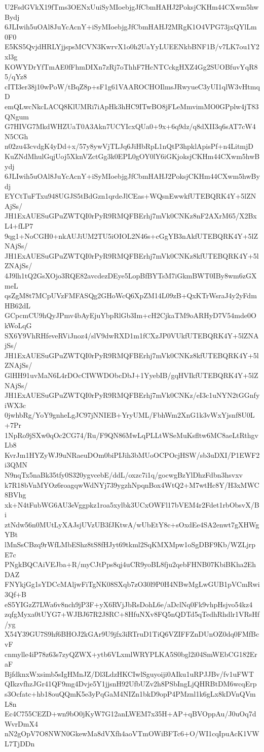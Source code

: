 U2FsdGVkX19fTms3OENxUuiSyMIoebjgJfCbmHAHJ2PoksjCKHm44CXwm5hwBydj
6JLIwih5uOAl8JuYcAcnY+iSyMIoebjgJfCbmHAHJ2MRgK1O4VPG73jxQYlLm0F0
E5KS5QvjdHRLYjjspsMCVN3KwrvX1o0h2UaYyLUEENkbBNF1B/v7LK7ou1Y2xl3g
KOWYDrYfTmAE0fFhmDIXn7zRj7oThhF7HcNTCckgHXZ4Gg2SUOBfuvYqR85/qYz8
cITI3er38j10wPoW/tBqZ8p+sF1g61VAAROCHOIlmsJRwyueC3yUI1qlW3vHtmqD
emQLwcNkcLACQ8KlUMRi7iApHk3hHC9ITwBO8jFLeMmvimMO0GPplw4jT83QNgum
G7HIVG7MkdWHZUaT0A3Akn7UCYIcxQUa0+9x+6q9dz/q8dXII3q6sAT7cW4N5CGh
n02zu43cvdgK4yDd+x/57y8ywVjTLJq6JiHbRpL1nQtP3hpklApisPf+n4LitmjD
KuZNdMhulGqjUoj5XknVZctGg3k0EPL0gOY0lY6iGKjoksjCKHm44CXwm5hwBydj
6JLIwih5uOAl8JuYcAcnY+iSyMIoebjgJfCbmHAHJ2PoksjCKHm44CXwm5hwBydj
EYCtTuFTxu948UGJS5tBdGzn1qrdeJlCEas+WQsnEwwkfUTEBQRK4Y+5lZNAjSs/
JH1ExAUESuGPuZWTQI0rPyR9RMQFBErhj7mVk0CNKz8nF2AXrM65/X2BxL4+fLP7
9qg1+NoCGH0+nkAUJiUM2TU5iOIOL2N46s+cGgYB3nAkfUTEBQRK4Y+5lZNAjSs/
JH1ExAUESuGPuZWTQI0rPyR9RMQFBErhj7mVk0CNKz8kfUTEBQRK4Y+5lZNAjSs/
4J9lh1tQ2GsXOjo3RQE82avcdezDEye5LopBfBYTsM7iGkmBWT0IBy8wm6zGXmeL
qsZgM8t7MCpUVzFMFASQg2GHoWcQ6XpZM14L09zB+QxKTrWsraJ4y2yFdmHB62dL
GCpcmCU9hQyJPmv4bAyEjuYbpRlGb3Im+cH2CjkaTM9oARHyD7V54mde0OkWoLqG
SX6Y9VhRHfeveRViJnoz4/slV9dwRXD1m1fCXzJP0VUkfUTEBQRK4Y+5lZNAjSs/
JH1ExAUESuGPuZWTQI0rPyR9RMQFBErhj7mVk0CNKz8kfUTEBQRK4Y+5lZNAjSs/
GlHH91uvMaN6L4rDOcCIWWDObcDbJ+1YyebIB/gqHVIkfUTEBQRK4Y+5lZNAjSs/
JH1ExAUESuGPuZWTQI0rPyR9RMQFBErhj7mVk0CNKz/eI3c1uNYN2tGGnfyiWX3c
0jwhbRg/YoY9gnheLgJC97jNNIEB+YryUML/FbhWm2XnG1k3vWxYjsnf8U0L+7Pr
1NpRo9jSXw0qOc2CG74/Ru/F9QN86MwLqPLLtWSeMuKsfltw6MC8aeLtRthgvLb8
KvrJm1HYZyWJ9uNRaeuDOm0biPIJih3bMUoOCPOcjHSW/sb3uDXI/P1EWF2i3QMN
N9nqTx5naBk35tfy0S320ygvcebE/ddL/oxzc7i1q/gocwgBzYlDhzFdbn3hsvxv
k7R18bVnMYOz6roagqwWdNYj739ygzhNpqnBox4WtQ2+M7wtHc8Y/H3xMWC8BVhg
xk+N4tFubWG6AU3eVggpkz1roa5xylbk3UCxOWFl17bVEM4r2Fdet1rbObsvX/Bi
ztNdw56n0MUtLyXAJsjUVzUB3fJKtwA/wUbEtY8c+sOxdEe4SA2enwt7gXHWgYBt
lMnSsCBzq9rWfLMbEShz8tS8fHJyt69tkml2SqKMXMpw1oSgDBF9Kb/WZLjrpE7c
PNgkBQCAiVEJba+R/myCJtPps8qj4uCR9yoBL8fju2qebFHNB07KbiBKha2EhDAZ
FNYkjGg1sYDCcMAljwFiTgNK08SXqb7zO30l9P0H4NBwMgLwGUB1pVCmRwi3Qf+B
eS5YIGzZ7LWa6v8nch9jP3F+yX6RVjJbRsDohL6e/aDclNq0Fk9vhpHsjvo54kz4
zqfgMyxa0tUYG7+WJBJ67R2J8RC+8HfuNXv8FQ5nQDTd5qTedhRhdlr1VRsHf/yg
X54Y39GU7S9hf6BHOJ2kGAr9U9jfx3iRTruD1TiQ6VZIFFZnDUnOZ0dq0FMfBcvF
cnmylle4iP78z63s7zyQZWX+ytb6VLxmlWRYPLKA5S0bgl2i04SmWEbCG182EraF
BjfdknxWxsimb5sIgHMnJZ/Dl3LdzHKCIwlSguyoiji0AIku1uRPJJBv/fv1uFWT
QIkzvfhzJGr41QF9mg4Dvje5Y1jjsnH92UfbUZv2h8PSbIngLjQHRBtDM6wcqErp
s3Ocfatc+hb18ouQQmK5e3yPqGaM4NIZn1bkD9opP4PMznl1k6gLx8kDVnQVmL8n
Ec4C755CEZD+wn9bO0jKyW7G12anLWEM7x35H+AP+qBVOppAu/J0uOq7dWvrDmX4
nN2gOpV7O8NWN0GkewMa8dVXfh4aoVTmOWiBFTc6+O/WI1cqIpuAcK1VWL7TjDDn

